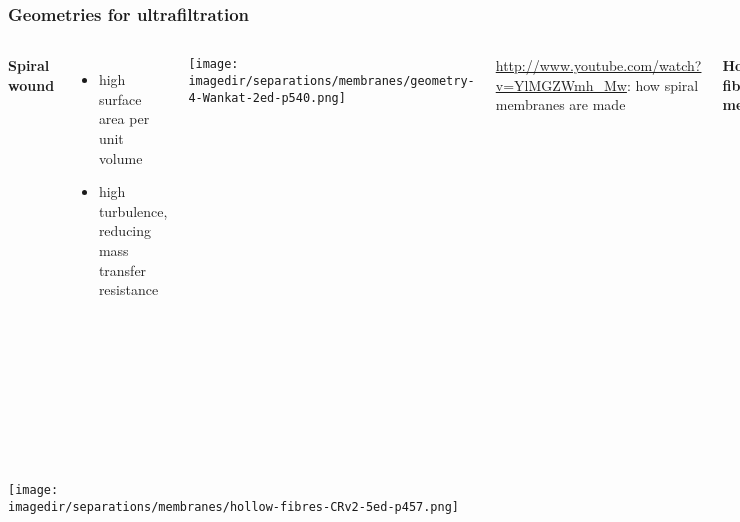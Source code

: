 \begin{frame}\frametitle{Geometries for ultrafiltration}
	\begin{columns}[t]
			\textbf{Spiral wound}

				\begin{itemize}
					\item	high surface area per unit volume
					\item	high turbulence, reducing mass transfer resistance
				\end{itemize}
			\vfill
			\begin{center}
				\texttt{[image: \\imagedir/separations/membranes/geometry-4-Wankat-2ed-p540.png]}
			\end{center}
			
			{\tiny \href{http://www.youtube.com/watch?v=YlMGZWmh\_Mw}{http://www.youtube.com/watch?v=YlMGZWmh\_Mw}: how spiral membranes are made}
			
			\textbf{Hollow fibre membranes}
			\begin{itemize}
				\item	largest area to volume ratio
				\item	fibre inside diameter = 500 to 1100 \micron~ for UF
				\item	UF: feed inside tube, with thin membrane skin on the inside
			\end{itemize}
			\begin{center}
				\texttt{[image: \\imagedir/separations/membranes/geometry-6-Wankat-2ed-p540.png]}
			\end{center}
	\end{columns}
\end{frame}

\begin{frame}\frametitle{}
	\begin{center}
		\texttt{[image: \\imagedir/separations/membranes/hollow-fibres-CRv2-5ed-p457.png]}
	\end{center}
\end{frame}

